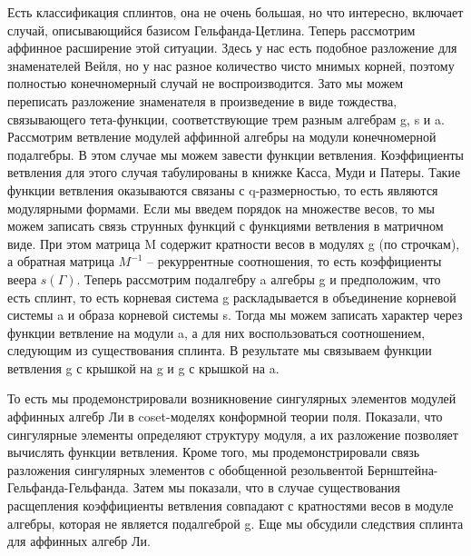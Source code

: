 \documentclass{article}
\theoremstyle{definition} \newtheorem{Def}{Определение}
\begin{document}
Есть классификация сплинтов, она не очень большая, но что интересно, включает случай, описывающийся базисом Гельфанда-Цетлина. 
Теперь рассмотрим аффинное расширение этой ситуации. Здесь у нас есть подобное разложение для знаменателей Вейля, но у нас разное количество чисто мнимых корней, поэтому полностью конечномерный случай не воспроизводится. Зато мы можем переписать разложение знаменателя в произведение в виде тождества, связывающего тета-функции, соответствующие трем разным алгебрам g, s и a. 
Рассмотрим ветвление модулей аффинной алгебры на модули конечномерной подалгебры. В этом случае мы можем завести функции ветвления. Коэффициенты ветвления для этого случая табулированы в книжке Касса, Муди и Патеры. 
Такие функции ветвления оказываются связаны с q-размерностью, то есть являются модулярными формами. 
Если мы введем порядок на множестве весов, то мы можем записать связь струнных функций с функциями ветвления в матричном виде. При этом матрица M содержит кратности весов в модулях g (по строчкам), а обратная матрица $M^{-1}$ -- рекуррентные соотношения, то есть коэффициенты веера $s(\Gamma)$. 
Теперь рассмотрим подалгебру a алгебры g и предположим, что есть сплинт, то есть корневая система g раскладывается в объединение корневой системы a и образа корневой системы s. 
Тогда мы можем записать характер через функции ветвление на модули a, а для них воспользоваться соотношением, следующим из существования сплинта. В результате мы связываем функции ветвления g с крышкой на g и g с крышкой на a. 

То есть мы продемонстрировали возникновение сингулярных элементов модулей аффинных алгебр Ли в coset-моделях конформной теории поля. Показали, что сингулярные элементы определяют структуру модуля, а их разложение позволяет вычислять функции ветвления. 
Кроме того, мы продемонстрировали связь разложения сингулярных элементов с обобщенной резольвентой Бернштейна-Гельфанда-Гельфанда. Затем мы показали, что в случае существования расщепления коэффициенты ветвления совпадают с кратностями весов в модуле алгебры, которая не является подалгеброй g. 
Еще мы обсудили следствия сплинта для аффинных алгебр Ли.
\end{document}
